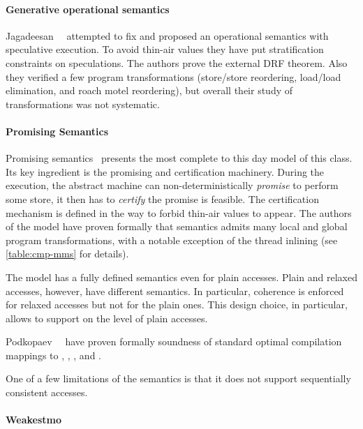 \paragraph{Generative operational semantics}

Jagadeesan~\etal~\cite{Jagadeesan-al:ESOP10} attempted to fix \JMM 
and proposed an operational semantics with speculative execution.
To avoid thin-air values they have put stratification constraints 
on speculations. The authors prove the external DRF theorem. 
Also they verified a few program transformations 
(store/store reordering, load/load elimination, and roach motel reordering), 
but overall their study of transformations was not systematic.  

\paragraph{Promising Semantics}

Promising semantics~\cite{Kang-al:POPL17, Lee-al:PLDI20} 
presents the most complete to this day model of this class. 
Its key ingredient is the promising and certification machinery.
During the execution, the abstract machine can 
non-deterministically \emph{promise} to perform some store,
it then has to \emph{certify} the promise is feasible. 
The certification mechanism is defined in the way to forbid thin-air values to appear.
The authors of the model have proven formally 
that \Promising semantics admits many local and global program transformations,
with a notable exception of the thread inlining
(see \cref{table:cmp-mms} for details).

The model has a fully defined semantics even for plain accesses.  
Plain and relaxed accesses, however, have different semantics.
In particular, coherence is enforced for relaxed accesses 
but not for the plain ones.  
This design choice, in particular, allows to support 
\CSE on the level of plain accesses. 

Podkopaev~\etal~\cite{Podkopaev-al:ECOOP17, Podkopaev-al:POPL19} have proven formally
soundness of standard optimal compilation mappings to \xTSO, , , and \POWER.

One of a few limitations of the \Promising semantics is that 
it does not support sequentially consistent accesses. 

\paragraph{Weakestmo}

